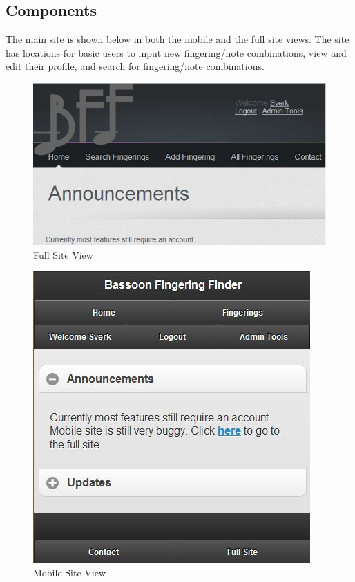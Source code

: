 \documentclass[12pt,english]{article}
\begin{document}
\subsection{Components}
The main site is shown below in both the mobile and the full site views.
The site has locations for basic users to input new fingering/note
combinations, view and edit their profile, and search for fingering/note
combinations.

\begin{figure}[H]
\caption{Full Site View}
\includegraphics[scale=0.55]{1} 
\end{figure}
\begin{figure}[H]
\caption{Mobile Site View}
\includegraphics[scale=0.55]{2} 
\end{figure}
\end{document}

